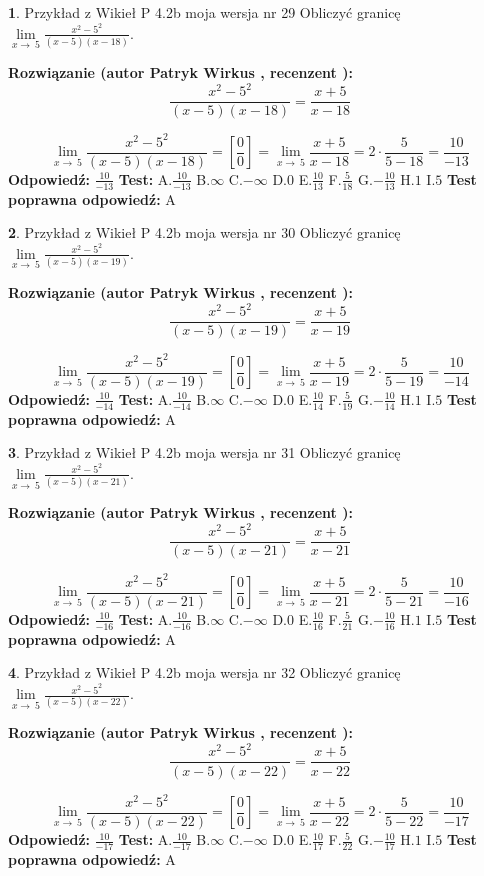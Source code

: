 \documentclass[12pt, a4paper]{article}
\theoremstyle{definition} %
\newtheorem{zad}{}
\newcommand{\zadStart}[1]{\begin{zad}#1\newline}
\newcommand{\zadStop}{\end{zad}}
\newcommand{\rozwStart}[2]{\noindent \textbf{Rozwiązanie (autor #1 , recenzent #2): }\newline}
\newcommand{\rozwStop}{\newline}
\newcommand{\odpStart}{\noindent \textbf{Odpowiedź:}\newline}
\newcommand{\odpStop}{\newline}
\newcommand{\testStart}{\noindent \textbf{Test:}\newline}
\newcommand{\testStop}{\newline}
\newcommand{\kluczStart}{\noindent \textbf{Test poprawna odpowiedź:}\newline}
\newcommand{\kluczStop}{\newline}
\begin{document}
\zadStart{Przykład z Wikieł P 4.2b moja wersja nr 29}
Obliczyć granicę $\lim\limits_{x\to\ 5}\frac{x^{2}-5^{2}}{(x-5)(x-18)}$.
\zadStop
\rozwStart{Patryk Wirkus}{}
$$\frac{x^{2}-5^{2}}{(x-5)(x-18)}=\frac{x+5}{x-18}$$

$$\lim\limits_{x\to\ 5}\frac{x^{2}-5^{2}}{(x-5)(x-18)}=[\frac{0}{0}]=\lim\limits_{x\to\ 5}\frac{x+5}{x-18}=2 \cdot \frac{5}{5-18} = \frac{10}{-13}$$
\rozwStop
\odpStart
$\frac{10}{-13}$
\odpStop
\testStart
A.$\frac{10}{-13}$
B.$\infty$
C.$-\infty$
D.$0$
E.$\frac{10}{13}$
F.$\frac{5}{18}$
G.$-\frac{10}{13}$
H.$1$
I.$5$
\testStop
\kluczStart
A
\kluczStop



\zadStart{Przykład z Wikieł P 4.2b moja wersja nr 30}
Obliczyć granicę $\lim\limits_{x\to\ 5}\frac{x^{2}-5^{2}}{(x-5)(x-19)}$.
\zadStop
\rozwStart{Patryk Wirkus}{}
$$\frac{x^{2}-5^{2}}{(x-5)(x-19)}=\frac{x+5}{x-19}$$

$$\lim\limits_{x\to\ 5}\frac{x^{2}-5^{2}}{(x-5)(x-19)}=[\frac{0}{0}]=\lim\limits_{x\to\ 5}\frac{x+5}{x-19}=2 \cdot \frac{5}{5-19} = \frac{10}{-14}$$
\rozwStop
\odpStart
$\frac{10}{-14}$
\odpStop
\testStart
A.$\frac{10}{-14}$
B.$\infty$
C.$-\infty$
D.$0$
E.$\frac{10}{14}$
F.$\frac{5}{19}$
G.$-\frac{10}{14}$
H.$1$
I.$5$
\testStop
\kluczStart
A
\kluczStop



\zadStart{Przykład z Wikieł P 4.2b moja wersja nr 31}
Obliczyć granicę $\lim\limits_{x\to\ 5}\frac{x^{2}-5^{2}}{(x-5)(x-21)}$.
\zadStop
\rozwStart{Patryk Wirkus}{}
$$\frac{x^{2}-5^{2}}{(x-5)(x-21)}=\frac{x+5}{x-21}$$

$$\lim\limits_{x\to\ 5}\frac{x^{2}-5^{2}}{(x-5)(x-21)}=[\frac{0}{0}]=\lim\limits_{x\to\ 5}\frac{x+5}{x-21}=2 \cdot \frac{5}{5-21} = \frac{10}{-16}$$
\rozwStop
\odpStart
$\frac{10}{-16}$
\odpStop
\testStart
A.$\frac{10}{-16}$
B.$\infty$
C.$-\infty$
D.$0$
E.$\frac{10}{16}$
F.$\frac{5}{21}$
G.$-\frac{10}{16}$
H.$1$
I.$5$
\testStop
\kluczStart
A
\kluczStop



\zadStart{Przykład z Wikieł P 4.2b moja wersja nr 32}
Obliczyć granicę $\lim\limits_{x\to\ 5}\frac{x^{2}-5^{2}}{(x-5)(x-22)}$.
\zadStop
\rozwStart{Patryk Wirkus}{}
$$\frac{x^{2}-5^{2}}{(x-5)(x-22)}=\frac{x+5}{x-22}$$

$$\lim\limits_{x\to\ 5}\frac{x^{2}-5^{2}}{(x-5)(x-22)}=[\frac{0}{0}]=\lim\limits_{x\to\ 5}\frac{x+5}{x-22}=2 \cdot \frac{5}{5-22} = \frac{10}{-17}$$
\rozwStop
\odpStart
$\frac{10}{-17}$
\odpStop
\testStart
A.$\frac{10}{-17}$
B.$\infty$
C.$-\infty$
D.$0$
E.$\frac{10}{17}$
F.$\frac{5}{22}$
G.$-\frac{10}{17}$
H.$1$
I.$5$
\testStop
\kluczStart
A
\kluczStop
\end{document}
